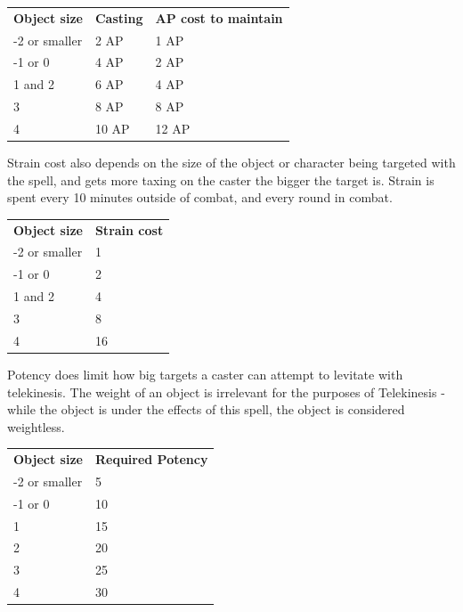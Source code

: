 \documentclass[11pt,a4paper,twocolumn]{book}
\begin{document}
\medskip
{
	\begin{tabu} to 75mm{| X[l,7] | X[l,5] | X[l,7] |}
		\hline
		\textbf{Object size} 			&\textbf{ Casting} 			& \textbf{AP cost to maintain} 	\\
       -2 or smaller					& 2 AP						& 1 AP 							\\
       -1 or 0     						& 4 AP						& 2 AP							\\ 
       1 and 2 							& 6 AP						& 4 AP							\\
       3								& 8 AP						& 8 AP							\\
       4								& 10 AP						& 12 AP							\\ \hline
	\end{tabu}
		
}
\medskip

Strain cost also depends on the size of the object or character being targeted with the spell, and gets more taxing on the caster the bigger the target is. Strain is spent every 10 minutes outside of combat, and every round in combat.

\medskip
{
	\begin{tabu} to 75mm{| X[l,7] | X[l,7] |}
		\hline
		\textbf{Object size} 			&\textbf{ Strain cost} 			\\
       -2 or smaller					& 1								\\
       -1 or 0     						& 2								\\ 
       1 and 2 							& 4								\\
       3								& 8								\\
       4								& 16							\\ \hline
	\end{tabu}
		
}
\medskip

Potency does limit how big targets a caster can attempt to levitate with telekinesis.
The weight of an object is irrelevant for the purposes of Telekinesis - while the object is under the effects of this spell, the object is considered weightless.

\medskip
{
	\begin{tabu} to 75mm{| X[l,7] | X[l,7] |}
		\hline
		\textbf{Object size} 			&\textbf{Required Potency} 			\\
       -2 or smaller					& 5									\\
       -1 or 0     						& 10								\\ 
       1 								& 15								\\
       2								& 20								\\
       3								& 25								\\
       4								& 30								\\ \hline
	\end{tabu}
		
}
\medskip
\end{document}
